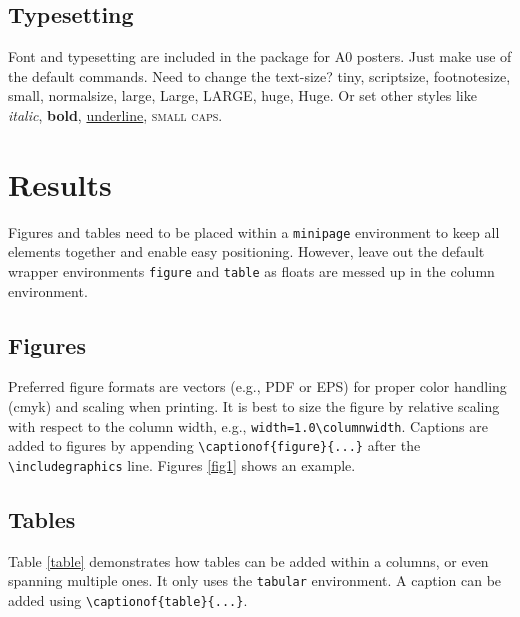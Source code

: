 \documentclass{article}
\begin{document}
\subsection*{Typesetting}
Font and typesetting are included in the package for A0 posters. Just make use of the default \latex commands. Need to change the text-size?
{\tiny tiny}, 
{\scriptsize scriptsize}, 
{\footnotesize footnotesize}, 
{\small small}, 
{\normalsize normalsize}, 
{\large large}, 
{\Large Large}, 
{\LARGE LARGE},
{\huge huge}, 
{\Huge Huge}.
Or set other styles like \textit{italic}, \textbf{bold}, \underline{underline}, \textsc{small caps}.

\pushdown %


\columnbreak %

\section*{Results}
Figures and tables need to be placed within a \verb|minipage| environment to keep all elements together and enable easy positioning.
However, leave out the default \latex wrapper environments \verb|figure| and \verb|table| as floats are messed up in the column environment.

\subsection*{Figures}

Preferred figure formats are vectors (e.g., PDF or EPS) for proper color handling (cmyk) and scaling when printing. It is best to size the figure by relative scaling with respect to the column width, e.g., \verb|width=1.0\columnwidth|.
Captions are added to figures by appending \verb|\captionof{figure}{...}| after the \verb|\includegraphics| line. Figures \ref{fig1} shows an example.

\subsection*{Tables}
Table \ref{table} demonstrates how tables can be added within a columns, or even spanning multiple ones. It only uses the \verb|tabular| environment. A caption can be added using \verb|\captionof{table}{...}|. 
\end{document}
